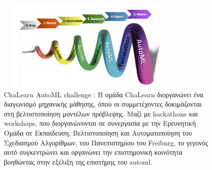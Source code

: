 \documentclass{article}
\begin{document}
\begin{figure}[H]
\begin{minipage}[c][11cm][t]{\textwidth}
  \centering
  \includegraphics[width=0.8\textwidth,height=4.5cm]{automl_1.png}
  \caption[ChaLearn AutoML challenge ]{ChaLearn AutoML challenge : Η ομάδα ChaLearn διοργανώνει ένα διαγωνισμό μηχανικής μάθησης, όπου οι συμμετέχοντες δοκιμάζονται στη βελτιστοποίηση μοντέλων πρόβλεψης. Μαζί με hackathons και workshops, που διοργανώνονται σε συνεργασία με την Ερευνητική Ομάδα σε Εκπαίδευση, Βελτιστοποίηση και Αυτοματοποίηση του Σχεδιασμού Αλγορίθμων, του Πανεπιστημίου του Freiburg, το γεγονός αυτό συγκεντρώνει και οργανώνει την επιστημονική κοινότητα βοηθώντας στην εξέλιξη της επιστήμης του automl. }
  \label{fig:test2}\par\vfill
\end{minipage}
\end{figure}
\pagestyle{empty}
\end{document}

